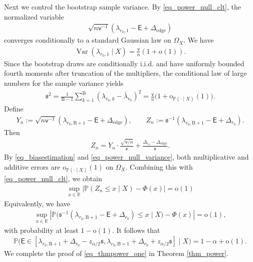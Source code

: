\documentclass[12pt]{article}
\theoremstyle{plain}
\numberwithin{equation}{section}
\begin{document}
Next we control the bootstrap sample variance. By \eqref{eq_power_null_clt}, the normalized variable
\begin{align*}
	\sqrt{n\mathsf v^{-1}}
	(\lambda_{r_0,1}-\mathsf E+\Delta_{\mathrm{edge}}) 
\end{align*}
converges conditionally to a standard Gaussian law on $\Omega_X$. We have
\begin{align*}
	\operatorname{Var}(\lambda_{r_0,1}\mid X)=\frac{\mathsf v}{n}(1+\mathrm o(1)).
\end{align*}
Since the bootstrap draws are conditionally i.i.d. and have uniformly bounded fourth moments after truncation of the multipliers, the conditional law of large numbers for the sample variance yields
\begin{align}\label{eq_power_null_variance}
	\mathfrak s^2=
	\frac{1}{\mathrm B-1}\sum_{k=1}^{\mathrm B}(\lambda_{r_0,k}-\bar\lambda_{r_0})^2=
	\frac{\mathsf v}{n}
	\big(1+\mathrm o_{\mathbb P(\cdot\mid X)}(1)\big).
\end{align}
Define
\begin{align*}
	Y_n:=\sqrt{n\mathsf v^{-1}}(\lambda_{r_0,\mathrm{B}+1}-\mathsf E+\Delta_{\mathrm{edge}}),\qquad
	Z_n:=\mathfrak s^{-1}(\lambda_{r_0,\mathrm{B}+1}-\mathsf E+\Delta_{r_0}). 
\end{align*}
Then
\begin{align*}
	Z_n=Y_n\cdot \frac{\sqrt{\mathsf v/n}}{\mathfrak s}+\frac{\Delta_{r_0}-\Delta_{\mathrm{edge}}}{\mathfrak s}.
\end{align*}
By \eqref{eq_biasestimation} and \eqref{eq_power_null_variance}, both multiplicative and additive errors are $\mathrm o_{\mathbb P(\cdot\mid X)}(1)$ on $\Omega_X$. Combining this with \eqref{eq_power_null_clt}, we obtain
\begin{align*}
	\sup_{x\in\mathbb R}
	\left|\mathbb P(Z_n\le x\mid X)-\Phi(x)
	\right|=\mathrm o(1)
\end{align*}
Equivalently, we have
\begin{align*}
	\sup_{x\in\mathbb R}\left|\mathbb P\big(\mathfrak{s}^{-1}(\lambda_{r_0,\mathrm{B}+1}-\mathsf{E}+\Delta_{r_0})\le x\mid X\big)-\Phi(x)\right|=\mathrm{o}(1),
\end{align*}
with probability at least $1-\mathrm{o}(1)$. It follows that
\begin{align*}
	\mathbb{P}\big(\mathsf{E}\in[\lambda_{r_0,\mathrm{B}+1}+\Delta_{r_0}-z_{\alpha/2}\mathfrak{s},\lambda_{r_0,\mathrm{B}+1}+\Delta_{r_0}+z_{\alpha/2}\mathfrak{s}]\mid X\big)=1-\alpha+\mathrm{o}(1).
\end{align*}
We complete the proof of \eqref{eq_thmpower_one} in Theorem \ref{thm_power}.
\end{document}
